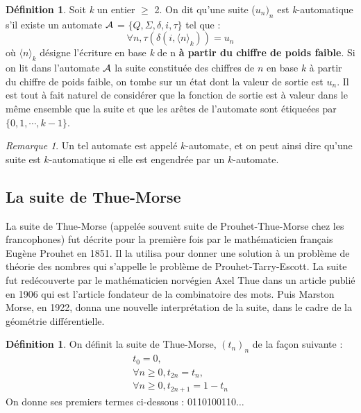 \documentclass[12pt]{article}
\theoremstyle{plain}
\theoremstyle{definition}
\newtheorem{definition}[theoreme]{D\'efinition}
\theoremstyle{remark}
\newtheorem{remarque}[theoreme]{Remarque}
\begin{document}
\begin{definition} 
  Soit \textit{k} un entier $\ge$ 2. On dit qu'une suite ($u_{n})_n$ est \textit{k}-automatique s'il
  existe un automate $\cal{A}$ = $\{Q,\Sigma,\delta,i,\tau\}$ tel que :
  \begin{displaymath}
    \forall{n},\tau(\delta(i,\langle{n}\rangle_k)) = u_{n}
  \end{displaymath}
  o\`u $\langle{n}\rangle_k$ d\'esigne l'\'ecriture en base \textit{k} de n \textbf{\`a partir du
  chiffre de poids faible}. Si on lit dans l'automate $\cal{A}$ la suite constitu\'ee des 
  chiffres de $n$ en base $k$ \`a partir du chiffre de poids faible, on tombe sur un \'etat dont la 
  valeur de sortie est $u_{n}$. Il est tout \`a fait naturel de consid\'erer que la fonction de 
  sortie est \`a valeur dans le m\^eme ensemble que la suite et que les ar\^etes de l'automate sont 
  \'etique\'ees  par $\{0,1,\cdots,k-1\}$.
\end{definition}

\begin{remarque}
  Un tel automate est appel\'e $k$-automate, et on peut ainsi dire qu'une suite est $k$-automatique si elle est 
  engendr\'ee par un $k$-automate.
\end{remarque} 

\subsection{La suite de Thue-Morse}
La suite de Thue-Morse (appel\'ee souvent suite de Prouhet-Thue-Morse chez les francophones) fut d\'ecrite pour la premi\`ere fois par le math\'ematicien fran\c cais Eug\`ene Prouhet en 1851. Il la utilisa pour donner une solution \`a un probl\`eme de th\'eorie des nombres qui s'appelle le probl\`eme de Prouhet-Tarry-Escott. La suite fut red\'ecouverte par le math\'ematicien norv\'egien Axel Thue dans un article publi\'e en 1906 qui est l'article fondateur de la combinatoire des mots. Puis Marston Morse, en 1922, donna une nouvelle interpr\'etation de la suite, dans le cadre de la g\'eom\'etrie diff\'erentielle.

\begin{definition}
  On d\'efinit la suite de Thue-Morse, $(t_{n})_{n}$ de la fa\c con suivante :
  \begin{displaymath}
  \begin{array}{c}
    t_{0} = 0,\\
    \forall{n}\ge0, t_{2n}=t_{n},\\
    \forall{n}\ge0, t_{2n+1}=1-t_{n}
  \end{array}
  \end{displaymath}
  On donne ses premiers termes ci-dessous : 0110100110$\ldots$
\end{definition}
\end{document}
